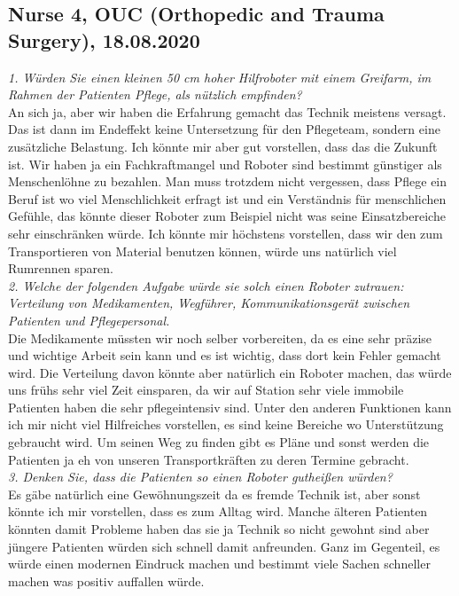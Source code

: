 \documentclass[plainarticle,zihtitle,english,final,hyperref,utf8]{zihpub}
\begin{document}
\begin{appendices}
\subsection{Nurse 4, OUC (Orthopedic and Trauma Surgery), 18.08.2020}
\textit{1. Würden Sie einen kleinen 50 cm hoher Hilfroboter mit einem Greifarm, im Rahmen der Patienten Pflege, als nützlich empfinden?}\\
\newline
An sich ja, aber wir haben die Erfahrung gemacht das Technik meistens versagt. Das ist dann im Endeffekt keine Untersetzung für den Pflegeteam, sondern eine zusätzliche Belastung. Ich könnte mir aber gut vorstellen, dass das die Zukunft ist. Wir haben ja ein Fachkraftmangel und Roboter sind bestimmt günstiger als Menschenlöhne zu bezahlen. Man muss trotzdem nicht vergessen, dass Pflege ein Beruf ist wo viel Menschlichkeit erfragt ist und ein Verständnis für menschlichen Gefühle, das könnte dieser Roboter zum Beispiel nicht was seine Einsatzbereiche sehr einschränken würde. Ich könnte mir höchstens vorstellen, dass wir den zum Transportieren von Material benutzen können, würde uns natürlich viel Rumrennen sparen.\\
\newline
\textit{2. Welche der folgenden Aufgabe würde sie solch einen Roboter zutrauen: Verteilung von Medikamenten, Wegführer, Kommunikationsgerät zwischen Patienten und Pflegepersonal.}\\
\newline
Die Medikamente müssten wir noch selber vorbereiten, da es eine sehr präzise und wichtige Arbeit sein kann und es ist wichtig, dass dort kein Fehler gemacht wird. Die Verteilung davon könnte aber natürlich ein Roboter machen, das würde uns frühs sehr viel Zeit einsparen, da wir auf Station sehr viele immobile Patienten haben die sehr pflegeintensiv sind. Unter den anderen Funktionen kann ich mir nicht viel Hilfreiches vorstellen, es sind keine Bereiche wo Unterstützung gebraucht wird. Um seinen Weg zu finden gibt es Pläne und sonst werden die Patienten ja eh von unseren Transportkräften zu deren Termine gebracht. \\
\newline
\textit{3. Denken Sie, dass die Patienten so einen Roboter gutheißen würden?}\\
\newline
Es gäbe natürlich eine Gewöhnungszeit da es fremde Technik ist, aber sonst könnte ich mir vorstellen, dass es zum Alltag wird. Manche älteren Patienten könnten damit Probleme haben das sie ja Technik so nicht gewohnt sind aber jüngere Patienten würden sich schnell damit anfreunden. Ganz im Gegenteil, es würde einen modernen Eindruck machen und bestimmt viele Sachen schneller machen was positiv auffallen würde.



\end{appendices}
\end{document}
